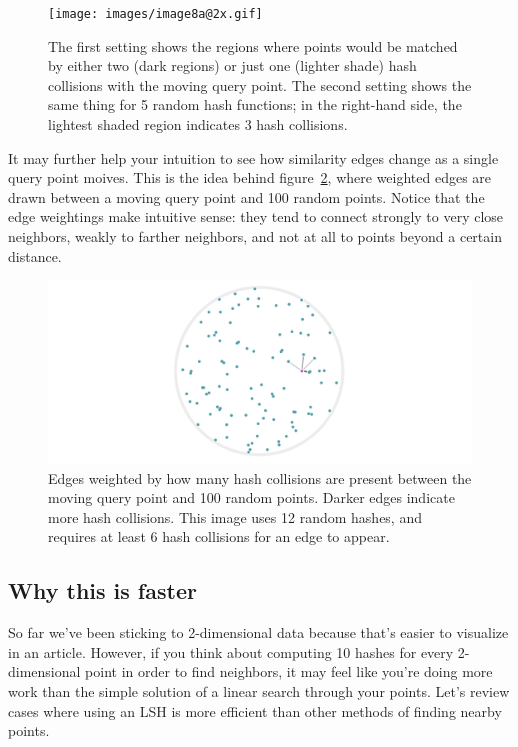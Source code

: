 \documentclass[20pt,]{extarticle}
\begin{document}
\begin{figure}
\centering
\texttt{[image: images/image8a@2x.gif]}
\caption{The first setting shows the regions where points would be
matched by either two (dark regions) or just one (lighter shade) hash
collisions with the moving query point. The second setting shows the
same thing for 5 random hash functions; in the right-hand side, the
lightest shaded region indicates 3 hash collisions.}\label{fig:fig8a}
\end{figure}

It may further help your intuition to see how similarity edges change as
a single query point moives. This is the idea behind
figure~\ref{fig:fig8b}, where weighted edges are drawn between a moving
query point and 100 random points. Notice that the edge weightings make
intuitive sense: they tend to connect strongly to very close neighbors,
weakly to farther neighbors, and not at all to points beyond a certain
distance.

\begin{figure}
\centering
\includegraphics{images/image8b@2x.gif}
\caption{Edges weighted by how many hash collisions are present between
the moving query point and 100 random points. Darker edges indicate more
hash collisions. This image uses 12 random hashes, and requires at least
6 hash collisions for an edge to appear.}\label{fig:fig8b}
\end{figure}

\subsection{Why this is faster}\label{why-this-is-faster}

So far we've been sticking to 2-dimensional data because that's easier
to visualize in an article. However, if you think about computing 10
hashes for every 2-dimensional point in order to find neighbors, it may
feel like you're doing more work than the simple solution of a linear
search through your points. Let's review cases where using an LSH is
more efficient than other methods of finding nearby points.
\end{document}
